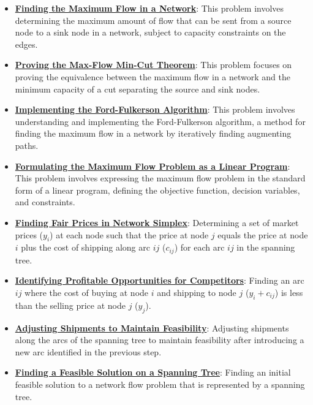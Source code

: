\documentclass{article}%
\begin{document}
\begin{itemize}[leftmargin=*]
\item \href{https://www.math.purdue.edu/~yipn/421/2024-11-19-MaxFlowMinCut.pdf#page=1}{\textbf{Finding the Maximum Flow in a Network}}: This problem involves determining the maximum amount of flow that can be sent from a source node to a sink node in a network, subject to capacity constraints on the edges. %
\item \href{https://www.math.purdue.edu/~yipn/421/2024-11-19-MaxFlowMinCut.pdf#page=8}{\textbf{Proving the Max{-}Flow Min{-}Cut Theorem}}: This problem focuses on proving the equivalence between the maximum flow in a network and the minimum capacity of a cut separating the source and sink nodes. %
\item \href{https://www.math.purdue.edu/~yipn/421/2024-11-19-MaxFlowMinCut.pdf#page=10}{\textbf{Implementing the Ford{-}Fulkerson Algorithm}}: This problem involves understanding and implementing the Ford-Fulkerson algorithm, a method for finding the maximum flow in a network by iteratively finding augmenting paths. %
\item \href{https://www.math.purdue.edu/~yipn/421/2024-11-19-MaxFlowMinCut.pdf#page=14}{\textbf{Formulating the Maximum Flow Problem as a Linear Program}}: This problem involves expressing the maximum flow problem in the standard form of a linear program, defining the objective function, decision variables, and constraints. %
\item \href{https://www.math.purdue.edu/~yipn/421/2024-11-21-EconNetSimplex.pdf#page=4}{\textbf{Finding Fair Prices in Network Simplex}}: Determining a set of market prices ($y_i$) at each node such that the price at node $j$ equals the price at node $i$ plus the cost of shipping along arc $ij$ ($c_{ij}$) for each arc $ij$ in the spanning tree. %
\item \href{https://www.math.purdue.edu/~yipn/421/2024-11-21-EconNetSimplex.pdf#page=5}{\textbf{Identifying Profitable Opportunities for Competitors}}: Finding an arc $ij$ where the cost of buying at node $i$ and shipping to node $j$ ($y_i + c_{ij}$) is less than the selling price at node $j$ ($y_j$). %
\item \href{https://www.math.purdue.edu/~yipn/421/2024-11-21-EconNetSimplex.pdf#page=6}{\textbf{Adjusting Shipments to Maintain Feasibility}}: Adjusting shipments along the arcs of the spanning tree to maintain feasibility after introducing a new arc identified in the previous step. %
\item \href{https://www.math.purdue.edu/~yipn/421/2024-11-21-EconNetSimplex.pdf#page=3}{\textbf{Finding a Feasible Solution on a Spanning Tree}}: Finding an initial feasible solution to a network flow problem that is represented by a spanning tree. %

\end{itemize}
\end{document}
